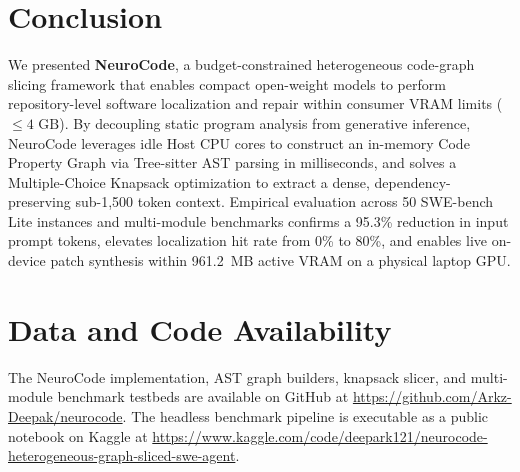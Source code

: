 \documentclass[conference]{IEEEtran}
\begin{document}
\section{Conclusion}
We presented \textbf{NeuroCode}, a budget-constrained heterogeneous code-graph slicing framework that enables compact open-weight models to perform repository-level software localization and repair within consumer VRAM limits ($\le 4\text{ GB}$). By decoupling static program analysis from generative inference, NeuroCode leverages idle Host CPU cores to construct an in-memory Code Property Graph via Tree-sitter AST parsing in milliseconds, and solves a Multiple-Choice Knapsack optimization to extract a dense, dependency-preserving sub-1,500 token context. Empirical evaluation across 50 SWE-bench Lite instances and multi-module benchmarks confirms a 95.3\% reduction in input prompt tokens, elevates localization hit rate from 0\% to 80\%, and enables live on-device patch synthesis within 961.2~MB active VRAM on a physical laptop GPU.

\section*{Data and Code Availability}
The NeuroCode implementation, AST graph builders, knapsack slicer, and multi-module benchmark testbeds are available on GitHub at \url{https://github.com/Arkz-Deepak/neurocode}. The headless benchmark pipeline is executable as a public notebook on Kaggle at \url{https://www.kaggle.com/code/deepark121/neurocode-heterogeneous-graph-sliced-swe-agent}.
\end{document}
